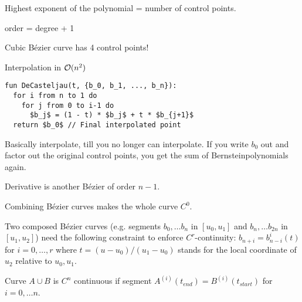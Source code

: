 \begin{definition}
  Highest exponent of the polynomial = number of control points.
\end{definition}

\begin{definition}
  order = degree + 1
\end{definition}

\begin{theorem}
  Cubic Bézier curve has 4 control points!
\end{theorem}

\begin{algorithm}
  \lstset{
    basicstyle=\small\ttfamily,
    language=Pascal,
    captionpos=b
  }
  Interpolation in \(\mathcal{O}(n^2)\) \vspace{-5pt}
  \begin{lstlisting}[mathescape=true]
fun DeCasteljau(t, {b_0, b_1, ..., b_n}):
  for i from n to 1 do
    for j from 0 to i-1 do
      $b_j$ = (1 - t) * $b_j$ + t * $b_{j+1}$
  return $b_0$ // Final interpolated point
\end{lstlisting}
Basically interpolate, till you no longer can interpolate. If you write \(b_0\) out and factor out the original control points, you get the sum of Bernsteinpolynomials again.
\end{algorithm}

\begin{theorem}
  Derivative is another Bézier of order \(n-1\).
\end{theorem}

\begin{theorem}
  Combining Bézier curves makes the whole curve \(C^0\).
\end{theorem}

\begin{definition}
  Two composed Bézier curves (e.g. segments \(b_0, \ldots b_n\) in \([u_0, u_1]\) and \(b_n, \ldots b_{2n}\) in \([u_1, u_2]\)) need the following constraint to enforce \(C^r\)-continuity:
  \(b_{n+i} = b_{n-i}^i(t)\) for \(i = 0, \ldots, r\) where \(t = (u - u_0) / (u_1 - u_0)\) stands for the local coordinate of \(u_2\) relative to \(u_0, u_1\).
\end{definition}

\begin{definition}
  Curve \(A \cup B\) is \(C^n\) continuous if segment \(A^{(i)}(t_{end}) = B^{(i)}(t_{start})\) for \(i = 0, \ldots n\).
\end{definition}

